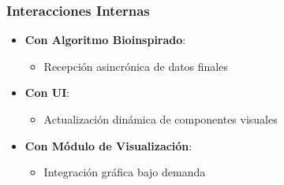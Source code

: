 \subsubsection{Interacciones Internas}
\begin{itemize}
    \item \textbf{Con Algoritmo Bioinspirado}:
    \begin{itemize}
        \item Recepción asincrónica de datos finales
    \end{itemize}
    \item \textbf{Con UI}:
    \begin{itemize}
        \item Actualización dinámica de componentes visuales
    \end{itemize}
    \item \textbf{Con Módulo de Visualización}:
    \begin{itemize}
        \item Integración gráfica bajo demanda
    \end{itemize}
\end{itemize}

